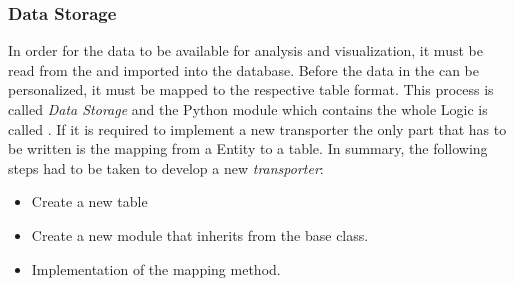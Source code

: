 \subsubsection{Data Storage}
\label{subsubsec:storage}
In order for the data to be available for analysis and visualization, it must be read from the \gds{} and imported into the \pg{} database.
Before the data in the \pg{} can be personalized, it must be mapped to the respective table format.
\newline
This process is called \textit{Data Storage} and the Python module which contains the whole Logic is called .
If it is required to implement a new transporter the only part that has to be written is the mapping from a \gds{} Entity to a \pg{} table.
\newline
In summary, the following steps had to be taken to develop a new \textit{transporter}:
\begin{itemize}
  \item Create a new \pg{} table
  \item Create a new  module that inherits from the base  class.
  \item Implementation of the mapping method.
\end{itemize}
